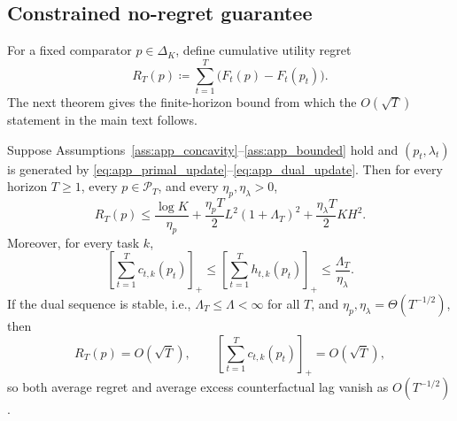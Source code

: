 \subsection{Constrained no-regret guarantee}
\label{app:theory_regret}

For a fixed comparator $p\in\Delta_K$, define cumulative utility regret
\begin{equation}
    R_T(p)
    \coloneqq
    \sum_{t=1}^T\bigl(F_t(p)-F_t(p_t)\bigr).
    \label{eq:app_regret}
\end{equation}
The next theorem gives the finite-horizon bound from which the $O(\sqrt{T})$ statement in the main text follows.

\begin{theorem}
\label{thm:app_no_regret}
Suppose Assumptions~\ref{ass:app_concavity}--\ref{ass:app_bounded} hold and $(p_t,\lambda_t)$ is generated by \eqref{eq:app_primal_update}--\eqref{eq:app_dual_update}. Then for every horizon $T\ge 1$, every $p\in\mathcal{P}_T$, and every $\eta_p,\eta_\lambda>0$,
\begin{equation}
    R_T(p)
    \le
    \frac{\log K}{\eta_p}
    +
    \frac{\eta_p T}{2}L^2(1+\Lambda_T)^2
    +
    \frac{\eta_\lambda T}{2}KH^2.
    \label{eq:app_finite_regret_bound}
\end{equation}
Moreover, for every task $k$,
\begin{equation}
    \left[
        \sum_{t=1}^T c_{t,k}(p_t)
    \right]_+
    \le
    \left[
        \sum_{t=1}^T h_{t,k}(p_t)
    \right]_+
    \le
    \frac{\Lambda_T}{\eta_\lambda}.
    \label{eq:app_constraint_bound}
\end{equation}
If the dual sequence is stable, i.e., $\Lambda_T\le\Lambda<\infty$ for all $T$, and $\eta_p,\eta_\lambda=\Theta(T^{-1/2})$, then
\begin{equation}
    R_T(p)=O(\sqrt{T}),
    \qquad
    \left[
        \sum_{t=1}^T c_{t,k}(p_t)
    \right]_+
    =O(\sqrt{T}),
    \label{eq:app_sqrt_rates}
\end{equation}
so both average regret and average excess counterfactual lag vanish as $O(T^{-1/2})$.
\end{theorem}

